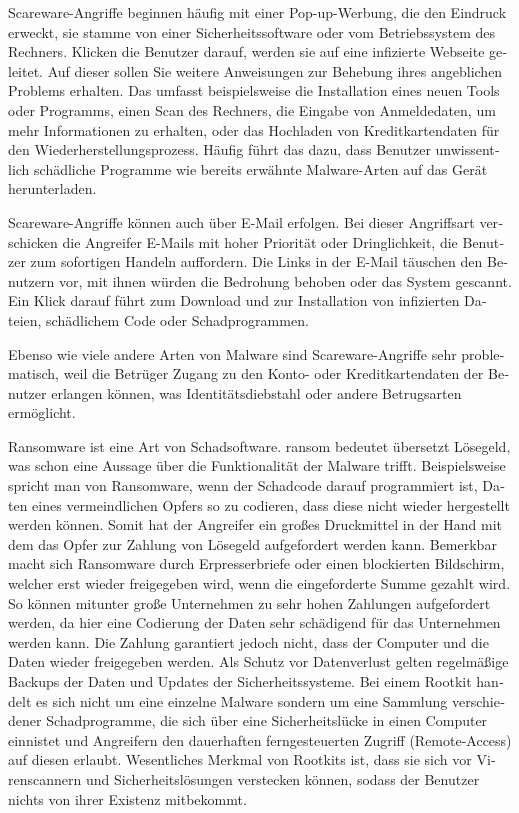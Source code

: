 \begin{otherlanguage}{ngerman}
    Scareware-Angriffe beginnen häufig mit einer Pop-up-Werbung, die den Eindruck erweckt, sie stamme von einer Sicherheitssoftware oder vom Betriebssystem des Rechners. Klicken die Benutzer darauf, werden sie auf eine infizierte Webseite geleitet. Auf dieser sollen Sie weitere Anweisungen zur Behebung ihres angeblichen Problems erhalten. Das umfasst beispielsweise die Installation eines neuen Tools oder Programms, einen Scan des Rechners, die Eingabe von Anmeldedaten, um mehr Informationen zu erhalten, oder das Hochladen von Kreditkartendaten für den Wiederherstellungsprozess. 
    Häufig führt das dazu, dass Benutzer unwissentlich schädliche Programme wie bereits erwähnte Malware-Arten auf das Gerät herunterladen.

    Scareware-Angriffe können auch über E-Mail erfolgen. Bei dieser Angriffsart verschicken die Angreifer E-Mails mit hoher Priorität oder Dringlichkeit, die Benutzer zum sofortigen Handeln auffordern. Die Links in der E-Mail täuschen den Benutzern vor, mit ihnen würden die Bedrohung behoben oder das System gescannt. Ein Klick darauf führt zum Download und zur Installation von infizierten Dateien, schädlichem Code oder Schadprogrammen.
    
    Ebenso wie viele andere Arten von Malware sind Scareware-Angriffe sehr problematisch, weil die Betrüger Zugang zu den Konto- oder Kreditkartendaten der Benutzer erlangen können, was Identitätsdiebstahl oder andere Betrugsarten ermöglicht.
    
    Ransomware ist eine Art von Schadsoftware. \dq ransom \dq{} bedeutet übersetzt Lösegeld, was schon eine Aussage über die Funktionalität der Malware trifft. Beispielsweise spricht man von Ransomware, wenn der Schadcode darauf programmiert ist, Daten eines vermeindlichen Opfers so zu codieren, dass diese nicht wieder hergestellt werden können. Somit hat der Angreifer ein großes Druckmittel in der Hand mit dem das Opfer zur Zahlung von Lösegeld aufgefordert werden kann. Bemerkbar macht sich Ransomware durch Erpresserbriefe oder einen blockierten Bildschirm, welcher erst wieder freigegeben wird, wenn die eingeforderte Summe gezahlt wird. So können mitunter große Unternehmen zu sehr hohen Zahlungen aufgefordert werden, da hier eine Codierung der Daten sehr schädigend für das Unternehmen werden kann. Die Zahlung garantiert jedoch nicht, dass der Computer und die Daten wieder freigegeben werden. Als Schutz vor Datenverlust gelten regelmäßige Backups der Daten und Updates der Sicherheitssysteme.
    Bei einem Rootkit handelt es sich nicht um eine einzelne Malware sondern um eine Sammlung verschiedener Schadprogramme, die sich über eine Sicherheitslücke in einen Computer einnistet und Angreifern den dauerhaften ferngesteuerten Zugriff (Remote-Access) auf diesen erlaubt. Wesentliches Merkmal von Rootkits ist, dass sie sich vor Virenscannern und Sicherheitslösungen verstecken können, sodass der Benutzer nichts von ihrer Existenz mitbekommt.


\end{otherlanguage}

